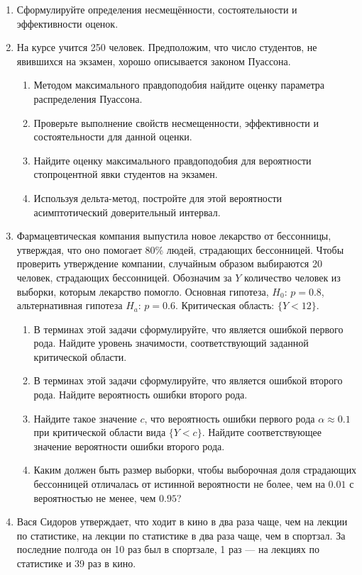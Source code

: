 \begin{enumerate}
\item	Сформулируйте определения несмещённости, состоятельности и эффективности оценок.
\item На курсе учится 250 человек. Предположим, что число студентов, не явившихся
на экзамен, хорошо описывается законом Пуассона.
\begin{enumerate}
\item	Методом максимального правдоподобия найдите оценку параметра распределения Пуассона.
\item	Проверьте выполнение свойств несмещенности, эффективности и состоятельности
для данной оценки.
\item	Найдите оценку максимального правдоподобия для вероятности стопроцентной
явки студентов на экзамен.
\item	Используя дельта-метод, постройте для этой вероятности асимптотический
доверительный интервал.
\end{enumerate}

\item	Фармацевтическая компания выпустила новое лекарство от бессонницы, утверждая,
что оно помогает 80\% людей, страдающих бессонницей. Чтобы проверить утверждение
компании, случайным образом выбираются 20 человек, страдающих бессонницей. Обозначим
за $Y$ количество человек из выборки, которым лекарство помогло. Основная гипотеза,
$H_0$: $p=0.8$, альтернативная гипотеза $H_a$: $p=0.6$. Критическая область: $\{Y<12\}$.
\begin{enumerate}
\item	В терминах этой задачи сформулируйте, что является ошибкой первого рода.
Найдите уровень значимости, соответствующий заданной критической области.
\item	В терминах этой задачи сформулируйте, что является ошибкой второго рода.
Найдите вероятность ошибки второго рода.
\item	Найдите такое значение $c$, что вероятность ошибки первого рода $\alpha
\approx 0.1$ при критической области вида $\{Y<c\}$. Найдите соответствующее
значение вероятности ошибки второго рода.
\item	Каким должен быть размер выборки, чтобы выборочная доля страдающих бессонницей
отличалась от истинной вероятности не более, чем на $0.01$ с вероятностью не менее,
чем $0.95$?
\end{enumerate}

\item	Вася Сидоров утверждает, что ходит в кино в два раза чаще, чем на лекции
по статистике, на лекции по статистике в два раза чаще, чем в спортзал. За
последние полгода он 10 раз был в спортзале, 1 раз — на лекциях по статистике и
39 раз в кино.


\end{enumerate}
